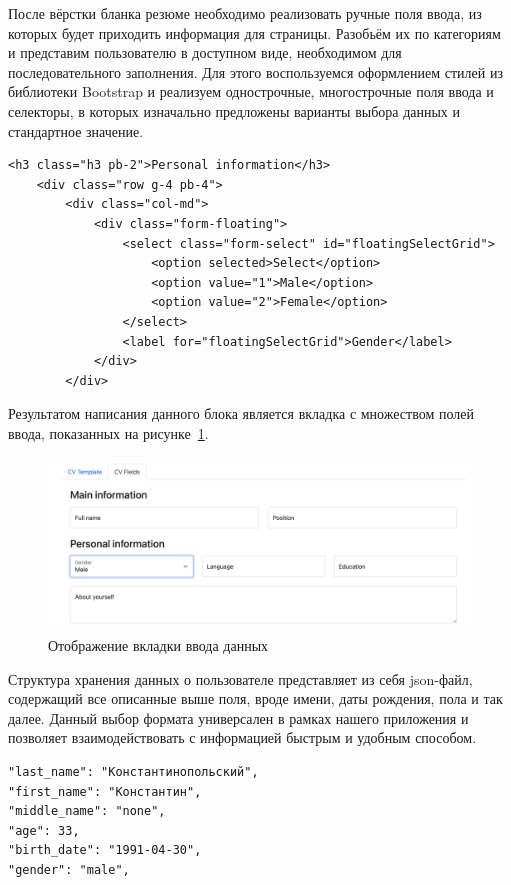\documentclass[master, och, diploma]{SCWorks}
\begin{document}
После вёрстки бланка резюме необходимо реализовать ручные поля ввода, из которых будет приходить информация для страницы. Разобьём их по категориям и представим пользователю в доступном виде, необходимом для последовательного заполнения. Для этого воспользуемся оформлением стилей из библиотеки Bootstrap и реализуем однострочные, многострочные поля ввода и селекторы, в которых изначально предложены варианты выбора данных и стандартное значение.
\begin{verbatim}
<h3 class="h3 pb-2">Personal information</h3>
    <div class="row g-4 pb-4">
        <div class="col-md">
            <div class="form-floating">
                <select class="form-select" id="floatingSelectGrid">
                    <option selected>Select</option>
                    <option value="1">Male</option>
                    <option value="2">Female</option>
                </select>
                <label for="floatingSelectGrid">Gender</label>
            </div>
        </div>
\end{verbatim}

Результатом написания данного блока является вкладка с множеством полей ввода, показанных на рисунке~\ref{fig:23}.
\begin{figure}[!ht]
    \centering
    \includegraphics[width=12cm]{images/image24.png}
    \caption{\label{fig:23}%
        Отображение вкладки ввода данных}
\end{figure}

Структура хранения данных о пользователе представляет из себя json-файл, содержащий все описанные выше поля, вроде имени, даты рождения, пола и так далее. Данный выбор формата универсален в рамках нашего приложения и позволяет взаимодействовать с информацией быстрым и удобным способом.
\begin{verbatim}
"last_name": "Константинопольский",
"first_name": "Константин",
"middle_name": "none",
"age": 33,
"birth_date": "1991-04-30",
"gender": "male",
\end{verbatim}
\end{document}

